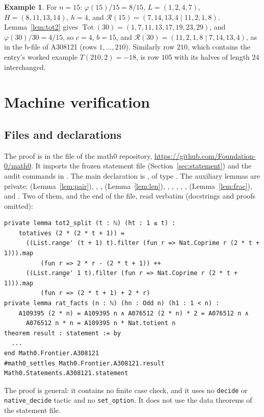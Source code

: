 \documentclass[11pt]{amsart}
\theoremstyle{plain}
\theoremstyle{definition}
\newtheorem{example}[theorem]{Example}
\newcommand{\Tot}{\operatorname{Tot}}
\newcommand{\R}{\mathcal{R}}
\begin{document}
\begin{example}
For $n=15$: $\varphi(15)/15=8/15$, $L=(1,2,4,7)$, $H=(8,11,13,14)$, $h=4$, and $\R(15)=(7,14,13,4\mid 11,2,1,8)$. Lemma~\ref{lem:tot2} gives $\Tot(30)=(1,7,11,13,17,19,23,29)$, and $\varphi(30)/30=4/15$, so $c=4$, $b=15$, and $\R(30)=(11,2,1,8\mid 7,14,13,4)$, as in the b-file of A308121 (rows $1,\dots,210$). Similarly row $210$, which contains the entry's worked example $T(210,2)=-18$, is row $105$ with its halves of length $24$ interchanged.
\end{example}

\section{Machine verification}\label{sec:lean}

\subsection*{Files and declarations}
The proof is in the file  of the math0 repository, \url{https://github.com/Foundation-0/math0}. It imports the frozen statement file  (Section~\ref{sec:statement}) and the audit commands in . The main declaration is , of type . The auxiliary lemmas are private:  (Lemma~\ref{lem:pair}), , ,  (Lemma~\ref{lem:len}), , , , , ,  (Lemma~\ref{lem:frac}),  and . Two of them, and the end of the file, read verbatim (docstrings and proofs omitted):
\begin{lstlisting}
private lemma tot2_split (t : ℕ) (ht : 1 ≤ t) :
    totatives (2 * (2 * t + 1)) =
      ((List.range' (t + 1) t).filter (fun r => Nat.Coprime r (2 * t + 1))).map
          (fun r => 2 * r - (2 * t + 1)) ++
      ((List.range' 1 t).filter (fun r => Nat.Coprime r (2 * t + 1))).map
          (fun r => (2 * t + 1) + 2 * r)
private lemma rat_facts (n : ℕ) (hn : Odd n) (h1 : 1 < n) :
    A109395 (2 * n) = A109395 n ∧ A076512 (2 * n) * 2 = A076512 n ∧
      A076512 n * n = A109395 n * Nat.totient n
theorem result : statement := by
  ...
end Math0.Frontier.A308121
#math0_settles Math0.Frontier.A308121.result Math0.Statements.A308121.statement
\end{lstlisting}
The proof is general: it contains no finite case check, and it uses no \texttt{decide} or \texttt{native\_decide} tactic and no \texttt{set\_option}. It does not use the data theorems of the statement file.
\end{document}
